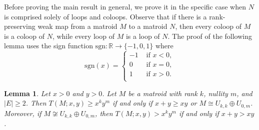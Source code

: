 \documentclass[12pt,reqno]{amsart}
\newtheorem{lemma}[theorem]{Lemma}
\theoremstyle{definition}
\theoremstyle{remark}
\numberwithin{equation}{section}
\begin{document}
     Before proving the main result in general, we prove it in the specific case when $N$ is comprised solely of loops and coloops. Observe that if there is a rank-preserving weak map from a matroid $M$ to a matroid $N$, then every coloop of $M$ is a coloop of $N $, while every loop of $M$ is a loop of $N$. The proof of the following lemma uses the sign function $\text{sgn} : \mathbb{R} \to \{-1,0,1\}$ where 
        \[
           \text{sgn}(x)=\begin{cases}
               -1 & \text{ if } x<0,\\  
                0 & \text{ if } x=0,\\  
                1 & \text{ if } x>0.\\  
           \end{cases}
        \] 
\begin{lemma}\label{lc}
    Let $x>0$ and $y>0$. Let $M$ be a matroid with rank $k$, nullity $m$, and $|E|\geq 2$. Then $T(M;x,y)\geq x^ky^{m}$ if and only if $x+y\geq xy$ or $M\cong U_{k,k}\oplus U_{0,m}$. Moreover, if $M\not\cong U_{k,k}\oplus U_{0,m}$, then $T(M;x,y)>x^ky^m$ if and only if $x+y>xy$. 
\end{lemma}
\end{document}
